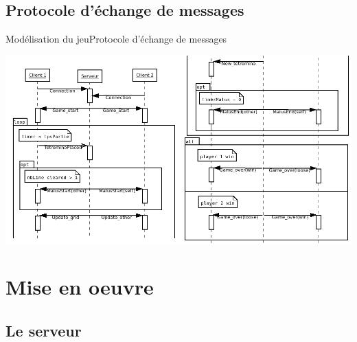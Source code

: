 \documentclass[french]{beamer}
\begin{document}
	\subsection{Protocole d'échange de messages}

		\begin{frame}{Modélisation du jeu}{Protocole d'échange de messages}
			\begin{center}
				\includegraphics[scale=0.35]{img/ech.png}
			\end{center}
		\end{frame}

\section{Mise en oeuvre}

	\subsection{Le serveur}
\end{document}
